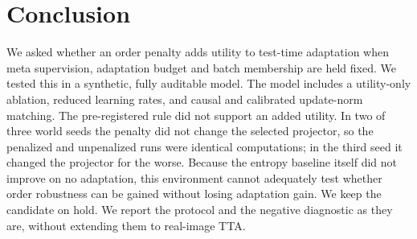 \section{Conclusion}
\label{sec:conclusion}

We asked whether an order penalty adds utility to test-time adaptation when meta supervision, adaptation
budget and batch membership are held fixed. We tested this in a synthetic, fully auditable model. The model
includes a utility-only ablation, reduced learning rates, and causal and calibrated update-norm matching.
The pre-registered rule did not support an added utility. In two of three world seeds the penalty did not
change the selected projector, so the penalized and unpenalized runs were identical computations; in the
third seed it changed the projector for the worse. Because the entropy baseline itself did not improve on no
adaptation, this environment cannot adequately test whether order robustness can be gained without losing
adaptation gain. We keep the candidate on hold. We report the protocol and the negative diagnostic as they
are, without extending them to real-image TTA.
